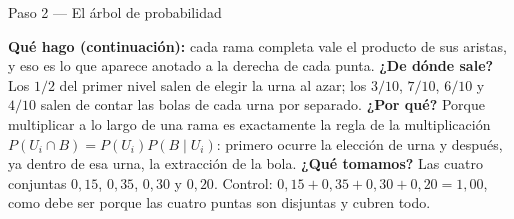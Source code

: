 \documentclass[11pt]{article}
\begin{document}
\begin{sol}
\begin{paso}{Paso 2 --- El árbol de probabilidad}
\begin{center}
\shorthandon{<>}
\end{center}

\textbf{Qué hago (continuación):} cada rama completa vale el producto de sus aristas, y eso es lo que aparece anotado a la derecha de cada punta.
\textbf{¿De dónde sale?} Los $1/2$ del primer nivel salen de elegir la urna al azar; los $3/10$, $7/10$, $6/10$ y $4/10$ salen de contar las bolas de cada urna por separado.
\textbf{¿Por qué?} Porque multiplicar a lo largo de una rama es exactamente la regla de la multiplicación $P(U_i\cap B)=P(U_i)P(B\mid U_i)$: primero ocurre la elección de urna y después, ya dentro de esa urna, la extracción de la bola.
\textbf{¿Qué tomamos?} Las cuatro conjuntas $0,15$, $0,35$, $0,30$ y $0,20$. Control: $0,15+0,35+0,30+0,20=1,00$, como debe ser porque las cuatro puntas son disjuntas y cubren todo.
\end{paso}


\end{sol}
\end{document}

